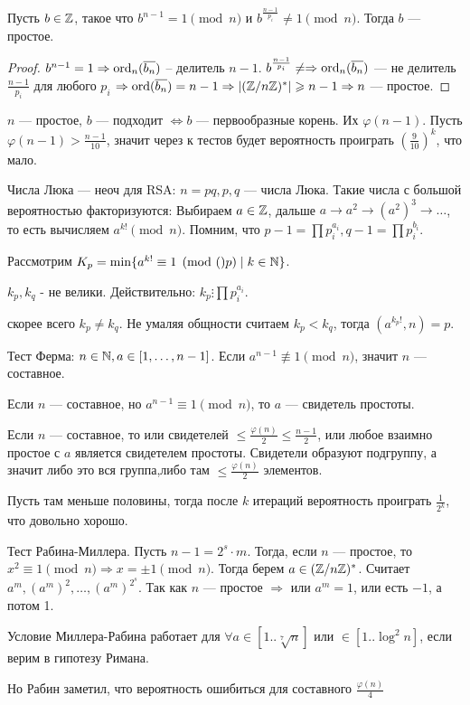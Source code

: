 \begin{theorem}
Пусть  $b \in \mathbb{Z}$, такое что  $b^{n-1}= 1 \pmod{n}$ и  $b^{\frac{n-1}{p_i}} \neq 1 \pmod{n}$. Тогда $b$ --- простое.
\end{theorem}
\begin{proof}
    $b^{n-1} = 1 \Rightarrow \operatorname{ord}_n(\overline{b_n})$ -- делитель  $n - 1$.
    $b^{\frac{n-1}{p_i}} \neq \Rightarrow \operatorname{ord}_n(\overline{b_n})$ --- не делитель $\frac{n-1}{p_i}$ для любого $p_i$  $\Rightarrow \operatorname{ord}(\overline{b_n}) = n-1 \Rightarrow |(\mathbb{Z} / n\mathbb{Z})^*| \geqslant n-1 \Rightarrow n$ --- простое.
\end{proof}
\begin{remark}
    $n$ --- простое,  $b$ --- подходит  $\iff b$ --- первообразные корень. Их $\varphi(n-1)$. Пусть $\varphi(n-1) > \frac{n - 1}{10}$, значит через к тестов будет вероятность проиграть $\left(\frac{9}{10}\right)^k$, что мало.
\end{remark}
\begin{remark}
    Числа Люка --- неоч для RSA: $n=pq, p, q$ --- числа Люка. Такие числа с большой вероятностью факторизуются: Выбираем  $a \in \mathbb{Z}$, дальше  $a\to a^2 \to (a^2)^3 \to \ldots$, то есть вычисляем $a^{k!} \pmod{n}$. Помним, что  $p - 1 = \prod p_i^{a_i}, q - 1 = \prod p_i^{b_i}$. 

    Рассмотрим  $K_p = \min \{a^{k!} \equiv 1 \pmod(p) \mid k \in \mathbb{N} \}$.  

    $k_p, k_q$ - не велики. Действительно:  $k_p \vdots \prod p_i^{a_i}$.

    скорее всего $k_p \neq k_q$. Не умаляя общности считаем  $k_p < k_q$, тогда  $(a^{k_p!}, n) = p$. 
\end{remark}
Тест Ферма: $n \in \mathbb{N}, a \in [1,\ldots,n-1]$. Если $a^{n-1} \not \equiv 1 \pmod{n}$, значит  $n$ --- составное. 
 \begin{definition}
     Если $n$ --- составное, но  $a^{n-1} \equiv 1 \pmod{n}$, то  $a$ --- свидетель простоты.
\end{definition}
Если $n$ --- составное, то или свидетелей  $\le \frac{\varphi(n)}{2} \le \frac{n-1}{2}$, или любое взаимно простое с $a$ является свидетелем простоты. Свидетели образуют подгруппу, а значит либо это вся группа,либо там $\le \frac{\varphi(n)}{2}$ элементов. 

Пусть там меньше половины, тогда после $k$ итераций вероятность проиграть  $\frac{1}{2^k}$, что довольно хорошо.

Тест Рабина-Миллера. Пусть $n-1 = 2^s \cdot m$. Тогда, если  $n$ --- простое, то  $x^2 \equiv 1 \pmod{n} \Rightarrow x = \pm 1 \pmod{n}$. Тогда берем  $a \in (\mathbb{Z} / n \mathbb{Z})^*$. Считает  $a^m, (a^m)^2, \ldots, (a^m)^{2^s}$. Так как $n$ --- простое  $\Rightarrow$ или $a^m = 1$, или есть  $-1$, а потом 1. 

Условие Миллера-Рабина работает для  $\forall a \in [1..\sqrt[7]{n}]$ или  $\in [1..\log^2 n]$, если верим в гипотезу Римана. 

Но Рабин заметил, что вероятность ошибиться для составного $\frac{\varphi(n)}{4}$ 
